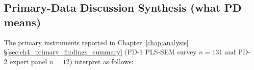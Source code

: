 \subsection{Primary-Data Discussion Synthesis (what PD means)}
\label{sec:ch5_primary_discussion_synthesis}

\noindent The primary instruments reported in Chapter~\ref{chap:analysis} §\ref{sec:ch4_primary_findings_summary} (PD-1 PLS-SEM survey $n{=}131$ and PD-2 expert panel $n{=}12$) interpret as follows:

